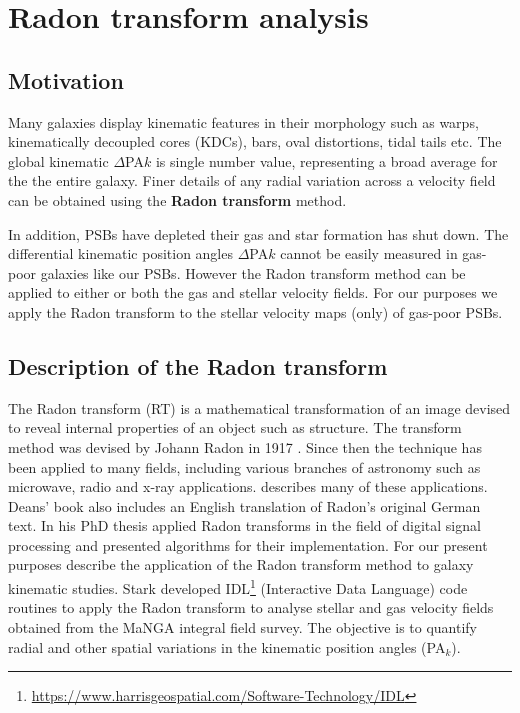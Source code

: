 \section{Radon transform analysis}
\label{sec:methods-II-Radon}

\subsection{Motivation}
\label{sec:motivation}

Many galaxies display kinematic features in their morphology such as warps, kinematically decoupled cores (KDCs), bars, oval distortions, tidal tails etc. The global kinematic $\Delta$PA${k}$ is single number value, representing a broad average for the the entire galaxy. Finer details of any radial variation across a velocity field can be obtained using the \textbf{Radon transform} method.

In addition, PSBs have depleted their gas and star formation has shut down. The differential kinematic position angles $\Delta$PA${k}$ cannot be easily measured in gas-poor galaxies like our PSBs. However the Radon transform method can be applied to either or both the gas and stellar velocity fields. For our purposes we apply the Radon transform to the stellar velocity maps (only) of gas-poor PSBs. 


\subsection{Description of the Radon transform}

The Radon transform (RT) is a mathematical transformation of an image devised to reveal internal properties of an object such as structure. The transform method was devised by Johann Radon in 1917 \citep{radon1917determination}. Since then the technique has been applied to many fields, including various branches of astronomy such as microwave, radio and x-ray applications. \citet{deans2007radon} describes many of these applications. Deans' book also includes an English translation of Radon's original German text. In his PhD thesis \cite{7910dc8d5b654c90ac4bc94c67d06f01} applied Radon transforms in the field of digital signal processing and presented algorithms for their implementation. For our present purposes \cite{2018MNRAS.480.2217S} describe the application of the Radon transform method to galaxy kinematic studies. Stark developed IDL\footnote{\href{https://www.harrisgeospatial.com/Software-Technology/IDL}{https://www.harrisgeospatial.com/Software-Technology/IDL}} (Interactive Data Language) code routines to apply the Radon transform to analyse stellar and gas velocity fields obtained from the MaNGA integral field survey. The objective is to quantify radial and other spatial variations in the kinematic position angles (PA$_{k}$).

